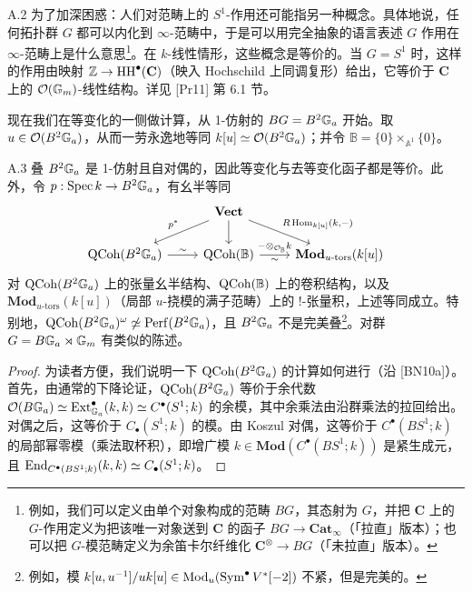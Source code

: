 \begin{rem}{A.2}\label{rem:a5-03-A-2}
为了加深困惑：人们对范畴上的 $S^1$-作用还可能指另一种概念。具体地说，任何拓扑群 $G$ 都可以内化到 $\infty$-范畴中，于是可以用完全抽象的语言表述 $G$ 作用在 $\infty$-范畴上是什么意思\footnote{例如，我们可以定义由单个对象构成的范畴 $BG$，其态射为 $G$，并把 $\mathbf C$ 上的 $G$-作用定义为把该唯一对象送到 $\mathbf C$ 的函子 $BG\to\mathbf{Cat}_\infty$（「拉直」版本）；也可以把 $G$-模范畴定义为余笛卡尔纤维化 $\mathbf C^{\otimes}\to BG$（「未拉直」版本）。}。在 $k$-线性情形，这些概念是等价的。当 $G=S^1$ 时，这样的作用由映射 $\mathbb{Z}\to\operatorname{HH}^\bullet(\mathbf C)$（映入 Hochschild 上同调复形）给出，它等价于 $\mathbf C$ 上的 $\mathcal{O}(\mathbb{G}_m)$-线性结构。详见 [Pr11] 第 6.1 节。
\end{rem}

现在我们在等变化的一侧做计算，从 1-仿射的 $BG=B^2\mathbb{G}_a$ 开始。取 $u\in\mathcal{O}(B^2\mathbb{G}_a)$，从而一劳永逸地等同 $k[u]\simeq\mathcal{O}(B^2\mathbb{G}_a)$；并令 $\mathbb B=\{0\}\times_{\mathbb A^1}\{0\}$。

\begin{prop}{A.3}\label{prop:a5-03-A-3}
叠 $B^2\mathbb{G}_a$ 是 1-仿射且自对偶的，因此等变化与去等变化函子都是等价。此外，令 $p:\operatorname{Spec} k\to B^2\mathbb{G}_a$，有幺半等同
\[
\begin{tikzcd}
& \mathbf{Vect} \arrow[dl,"p^*"'] \arrow[d] \arrow[dr,"R\Hom_{k[u]}(k{,}-)"] & \\
\QCoh(B^2\GG_a) \arrow[r,"\sim"] & \QCoh(\mathbb B) \arrow[r,"\sim"',"-\otimes_{\OO_{\mathbb B}}k"] & \mathbf{Mod}_{u\text{-}\mathrm{tors}}(k[u])
\end{tikzcd}
\]
对 $\operatorname{QCoh}(B^2\mathbb{G}_a)$ 上的张量幺半结构、$\operatorname{QCoh}(\mathbb B)$ 上的卷积结构，以及 $\mathbf{Mod}_{u\text{-}\mathrm{tors}}(k[u])$（局部 $u$-挠模的满子范畴）上的 $!$-张量积，上述等同成立。特别地，$\operatorname{QCoh}(B^2\mathbb{G}_a)^\omega\not\simeq\operatorname{Perf}(B^2\mathbb{G}_a)$，且 $B^2\mathbb{G}_a$ 不是完美叠\footnote{例如，模 $k[u,u^{-1}]/uk[u]\in\operatorname{Mod}_u(\operatorname{Sym}^\bullet V^*[-2])$ 不紧，但是完美的。}。对群 $G=B\mathbb{G}_a\rtimes\mathbb{G}_m$ 有类似的陈述。
\end{prop}

\begin{proof}
为读者方便，我们说明一下 $\operatorname{QCoh}(B^2\mathbb{G}_a)$ 的计算如何进行（沿 [BN10a]）。首先，由通常的下降论证，$\operatorname{QCoh}(B^2\mathbb{G}_a)$ 等价于余代数 $\mathcal{O}(B\mathbb{G}_a)\simeq\operatorname{Ext}^\bullet_{\mathbb{G}_a}(k,k)\simeq C^\bullet(S^1;k)$ 的余模，其中余乘法由沿群乘法的拉回给出。对偶之后，这等价于 $C_\bullet(S^1;k)$ 的模。由 Koszul
对偶，这等价于 $C^\bullet(BS^1;k)$ 的局部幂零模（乘法取杯积），即增广模 $k\in\mathbf{Mod}(C^\bullet(BS^1;k))$ 是紧生成元，且 $\operatorname{End}_{C^\bullet(BS^1;k)}(k,k)\simeq C_\bullet(S^1;k)$。
\end{proof}

